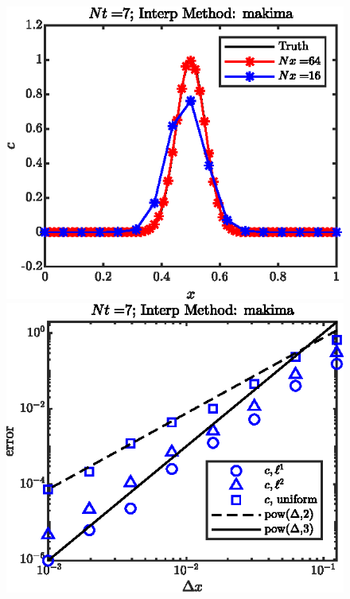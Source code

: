 \documentclass[11pt,letterpaper]{article}
\begin{document}
\begin{figure}[H]
    \centering
    \includegraphics{figs/1D_cons_makima_sol}
    \includegraphics{figs/1D_cons_makima_convord}
    \caption{}\label{fig:1D_cons_makima_}
\end{figure}
\end{document}
